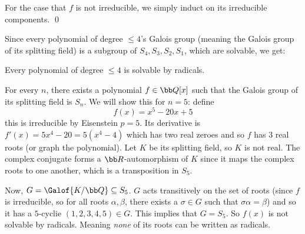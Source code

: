 For the case that $f$ is not irreducible, we simply induct on its irreducible components.
\qed

Since every polynomial of degree $\leq 4$'s Galois group (meaning the Galois group of its splitting field) is a subgroup of $S_4,S_3,S_2,S_1$, which are solvable, we get:

\bcoro

    Every polynomial of degree $\leq 4$ is solvable by radicals.

\ecoro

For every $n$, there exists a polynomial $f\in{\bb Q}[x]$ such that the Galois group of its splitting field is $S_n$.
We will show this for $n=5$: define
$$ f(x) = x^5 - 20x + 5 $$
this is irreducible by Eisenstein $p=5$.
Its derivative is $f'(x)=5x^4-20=5(x^4-4)$ which has two real zeroes and so $f$ has $3$ real roots (or graph the polynomial).
Let $K$ be its splitting field, so $K$ is not real.
The complex conjugate forms a ${\bb R}$-automorphism of $K$ since it maps the complex roots to one another, which is a transposition in $S_5$.

Now, $G=\Galof{K/{\bb Q}}\subseteq S_5$.
$G$ acts transitively on the set of roots (since $f$ is irreducible, so for all roots $\alpha,\beta$, there exists a $\sigma\in G$ such that $\sigma\alpha=\beta$) and so it has a $5$-cyclie
$(1,2,3,4,5)\in G$.
This implies that $G=S_5$.
So $f(x)$ is not solvable by radicals.
Meaning {\it none} of its roots can be written as radicals.

